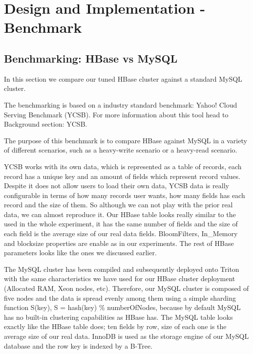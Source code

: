 \chapter{Design and Implementation - Benchmark}
\label{chapter:Design and Implementation - Benchmark}
 
\section{Benchmarking: HBase vs MySQL}

In this section we compare our tuned HBase cluster against a standard MySQL cluster.

\bigskip

The benchmarking is based on a industry standard benchmark: Yahoo! Cloud Serving Benchmark (YCSB). For more information about this tool head to Background section: YCSB.
\par
The purpose of this benchmark is to compare HBase against MySQL in a variety of different scenarios, such as a heavy-write scenario or a heavy-read scenario. 
\par
YCSB works with its own data, which is represented as a table of records, each record has a unique key and an amount of fields which represent record values. Despite it does not allow users to load their own data, YCSB data is really configurable in terms of how many records user wants, how many fields has each record and the size of them. So although we can not play with the prior real data, we can almost reproduce it. Our HBase table looks really similar to the used in the whole experiment, it has the same number of fields and the size of each field is the average size of our real data fields. BloomFilters, In\_Memory and blocksize properties are enable as in our experiments. The rest of HBase parameters looks like the ones we discussed earlier.
\par
The MySQL cluster has been compiled and subsequently deployed onto Triton with the same characteristics we have used for our HBase cluster deployment (Allocated RAM, Xeon nodes, etc). Therefore, our MySQL cluster is composed of five nodes and the data is spread evenly among them using a simple sharding function S(key), S = hash(key) \% numberOfNodes, because by default MySQL has no built-in clustering capabilities as HBase has. The MySQL table looks exactly like the HBase table does; ten fields by row, size of each one is the average size of our real data. InnoDB is used as the storage engine of our MySQL database and the row key is indexed by a B-Tree. 

